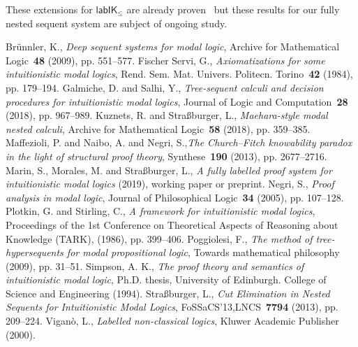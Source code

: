\documentclass[twoside]{aiml20}
\newcommand*{\IK}{\mathsf{IK}}
\newcommand*{\lab}{\mathsf{lab}}
\newcommand*{\labIKp}{\lab\IK_{\le}}
\begin{document}
%
These extensions for $\labIKp$ are already proven~\cite{marin:morales:strassburger:hal} but these results for our fully nested sequent system are subject of ongoing study. 



%
%

\begin{thebibliography}{}
	Br{\"u}nnler, K., \emph{Deep sequent systems for modal logic}, Archive for Mathematical Logic~\textbf{48} (2009), pp. 551--577.
	Fischer Servi, G., \emph{Axiomatizations for some intuitionistic modal logics}, Rend. Sem. Mat. Univers. Politecn. Torino~\textbf{42} (1984), pp. 179--194.
	Galmiche, D. and Salhi, Y., \emph{Tree-sequent calculi and decision procedures for intuitionistic modal logics}, Journal of Logic and Computation~\textbf{28} (2018), pp. 967--989.
	 Kuznets, R. and Stra{\ss}burger, L., \emph{Maehara-style modal nested calculi}, Archive for Mathematical Logic~\textbf{58} (2018), pp. 359--385.
	 Maffezioli, P. and Naibo, A. and Negri, S.,\emph{The {C}hurch--{F}itch knowability paradox in the light of structural proof theory}, Synthese~\textbf{190} (2013), pp. 2677--2716.
	 Marin, S., Morales, M. and Stra{\ss}burger, L., \emph{A fully labelled proof system for intuitionistic modal logics} (2019), working paper or preprint.
	 Negri, S., \emph{Proof analysis in modal logic}, Journal of Philosophical Logic~\textbf{34} (2005), pp. 107--128.
	 Plotkin, G. and Stirling, C., \emph{A framework for intuitionistic modal logics}, Proceedings of the 1st Conference on Theoretical Aspects of Reasoning about Knowledge (TARK), (1986), pp. 399--406.
	 Poggiolesi, F., \emph{The method of tree-hypersequents for modal propositional logic}, Towards mathematical philosophy (2009), pp. 31--51.
	 Simpson, A. K., \emph{The proof theory and semantics of intuitionistic modal logic}, Ph.D. thesis, University of Edinburgh. College of Science and Engineering (1994).
	 Stra{\ss}burger, L., \emph{Cut Elimination in Nested Sequents for Intuitionistic Modal Logics}, FoSSaCS'13,LNCS~\textbf{7794} (2013), pp. 209--224.
	Vigan\`o, L., \emph{Labelled non-classical logics}, Kluwer Academic Publisher (2000).
\end{thebibliography}
\end{document}
